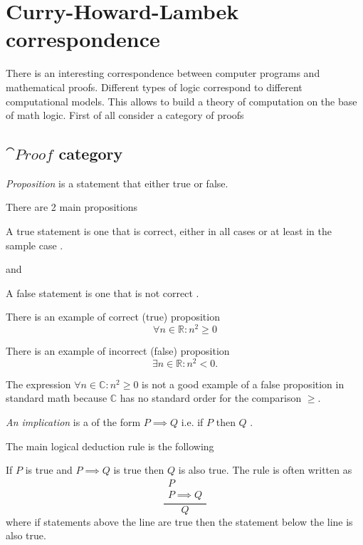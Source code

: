 \chapter{Curry-Howard-Lambek correspondence}
\label{sec:curry_howard_lambek}
There is an interesting correspondence between computer programs and
mathematical proofs. Different types of logic correspond to different
computational models. This allows to build a theory of computation on
the base of math logic. First of all consider a category of proofs
\section{$\cat{Proof}$ category}
\begin{definition}[Proposition]
\label{def:proposition}
\textit{Proposition} is a statement that either true or false.
\end{definition}

There are 2 main propositions
\begin{definition}[True]
\label{def:true}
A true statement is one that is correct, either in all cases or at
least in the sample case \cite{bib:studycom:truefalse}. 
\end{definition}
and
\begin{definition}[False]
\label{def:false}
A false statement is one that is not correct \cite{bib:studycom:truefalse}. 
\end{definition}


\begin{example}[Proposition]
\label{ex:proposition}
There is an example of correct (true) proposition
\[
\forall n \in \mathbb{R}: n^2 \ge 0
\]

There is an example of incorrect (false) proposition
\[
\exists n \in \mathbb{R}: n^2 < 0.
\]

The expression $\forall n \in \mathbb{C}: n^2 \ge 0$ is not a good
example of a false proposition in standard math because $\mathbb{C}$ has
no standard order for the comparison $\ge$.

\end{example}

\begin{definition}[Implication]
\label{def:implication} \textit{An implication} is a
 of the form $P \implies Q$ i.e. if $P$
then $Q$ \cite{bib:whatisaproof}.
\end{definition}

The main logical deduction rule is the following
\begin{definition}
\label{def:modusponens}
If $P$ is true and $P \implies Q$ is true then $Q$ is also true. The
rule is often written as \cite{bib:whatisaproof}
\[
\frac{
\begin{array}{c}
P \\
P \implies Q
\end{array}
}{Q}
\]
where if statements above the line are true then the statement below
the line is also true.
\end{definition}

